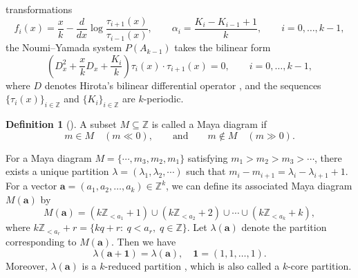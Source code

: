 \documentclass[preprint,3p,10pt]{elsarticle}
\theoremstyle{definition}
\newtheorem{definition}{Definition}[section]
\begin{document}
transformations
\begin{equation}
\label{eq:f-from-tau-PAkminus1}
    f_i(x)
    =
    \frac{x}{k}
    -
    \frac{d}{dx}
    \log
    \frac{\tau_{i+1}(x)}{\tau_{i-1}(x)},
    \qquad
    \alpha_i
    =
    \frac{K_i-K_{i-1}+1}{k},
    \qquad
    i=0,\ldots,k-1,
\end{equation}
the Noumi--Yamada system \(P(A_{k-1})\) takes the bilinear form
\cite{tsuda2005universal}
\begin{equation}
\label{eq:PAkminus1-tau-bilinear}
    \left(
        D_x^2+\frac{x}{k}D_x+\frac{K_i}{k}
    \right)
    \tau_i(x)\cdot\tau_{i+1}(x)=0,
    \qquad
    i=0,\ldots,k-1,
\end{equation}
where \(D\) denotes Hirota's bilinear differential operator
\cite{hirota2004direct}, and the sequences \(\{\tau_i(x)\}_{i\in\mathbb Z}\) and
\(\{K_i\}_{i\in\mathbb Z}\) are \(k\)-periodic.





\begin{definition}[\cite{tsuda2005universal}]
A subset \(M \subseteq\mathbb Z\) is called a Maya diagram if
\begin{equation}
    m\in M \quad (m\ll0),
    \qquad \text{and} \qquad
    m\notin M \quad (m\gg0).
\end{equation}
\end{definition}
For a Maya diagram $M=\{\cdots,m_3,m_2,m_1\}$ satisfying $m_1>m_2>m_3>\cdots$, there exists a unique partition \(\lambda=(\lambda_1,\lambda_2,\cdots)\) such that $m_i-m_{i+1}=\lambda_i-\lambda_{i+1}+1$. For a vector $\mathbf a=(a_1,a_2,\ldots,a_k)\in\mathbb Z^k$,  we can define its associated Maya diagram $M(\mathbf a)$ by
\begin{equation}
\label{eq:Maya-from-charge}
    M(\mathbf a)
    =
    (k\mathbb Z_{<a_1}+1)
    \cup
    (k\mathbb Z_{<a_2}+2)
    \cup
    \cdots
    \cup
    (k\mathbb Z_{<a_k}+k),
\end{equation}
where $k\mathbb Z_{<a_r}+r =  \{kq+r:\ q<a_r,\; q\in\mathbb Z\}.$
Let $\lambda(\mathbf{a})$ denote the partition corresponding to $M(\mathbf{a})$. Then we have
\begin{equation}
    \lambda(\mathbf a+\mathbf 1)=\lambda(\mathbf a),
    \quad
    \mathbf 1=(1,1,\ldots,1).
\end{equation}
Moreover, $\lambda(\mathbf{a})$ is a \(k\)-reduced partition \cite{tsuda2005universal}, which is also called a \(k\)-core partition.
\end{document}
